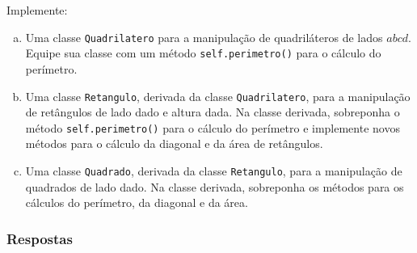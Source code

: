 \begin{exer}
  Implemente:
  \begin{enumerate}[a)]
  \item Uma classe \lstinline+Quadrilatero+ para a manipulação de quadriláteros de lados $abcd$. Equi\-pe sua classe com um método \lstinline+self.perimetro()+ para o cálculo do perímetro.
  \item Uma classe \lstinline+Retangulo+, derivada da classe \lstinline+Quadrilatero+, para a manipulação de retângulos de lado dado e altura dada. Na classe derivada, sobreponha o método \lstinline+self.perimetro()+ para o cálculo do perímetro e implemente novos métodos para o cálculo da diagonal e da área de retângulos.
  \item Uma classe \lstinline+Quadrado+, derivada da classe \lstinline+Retangulo+, para a manipulação de quadrados de lado dado. Na classe derivada, sobreponha os métodos para os cálculos do perímetro, da diagonal e da área.
  \end{enumerate}
\end{exer}

\ifisbook
\subsubsection{Respostas}
\shipoutAnswer
\fi
